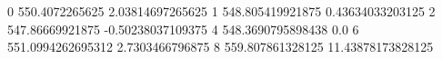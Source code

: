 0 550.4072265625 2.03814697265625
1 548.805419921875 0.43634033203125
2 547.86669921875 -0.50238037109375
4 548.3690795898438 0.0
6 551.0994262695312 2.7303466796875
8 559.807861328125 11.43878173828125
